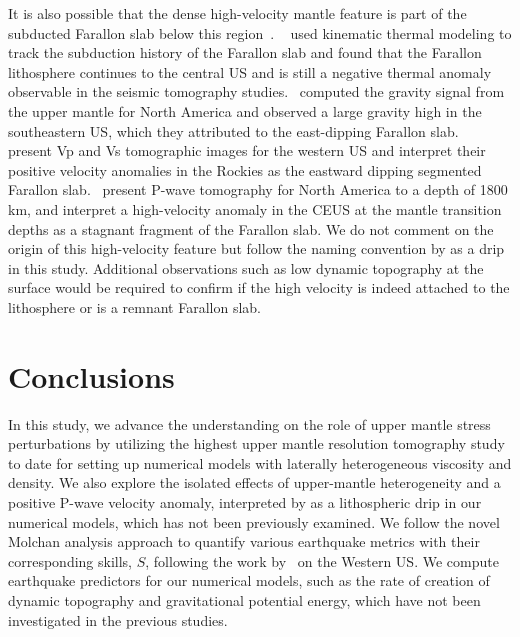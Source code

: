 \documentclass[draft,linenumbers]{agujournal2018}
\begin{document}
 It is also possible that the dense high-velocity mantle feature is part of the subducted Farallon slab below this region~\citep{schmid2002fate, mooney2010north, sigloch2008two, schmandt2010complex, sigloch2011mantle}. ~\citet{schmid2002fate} used kinematic thermal modeling to track the subduction history of the Farallon slab and found that the Farallon lithosphere continues to the central US and is still a negative thermal anomaly observable in the seismic tomography studies.~\citet{mooney2010north} computed the gravity signal from the upper mantle for North America and observed a large gravity high in the southeastern US, which they attributed to the east-dipping Farallon slab.~\citet{schmandt2010complex} present Vp and Vs tomographic images for the western US and interpret their positive velocity anomalies in the Rockies as the eastward dipping segmented Farallon slab.~\citet{sigloch2008two, sigloch2011mantle} present P-wave tomography for North America to a depth of 1800 km, and interpret a high-velocity anomaly in the CEUS at the mantle transition depths as a stagnant fragment of the Farallon slab.  We do not comment on the origin of this high-velocity feature but follow the naming convention by \citet{Biryol_2016} as a drip in this study. Additional observations such as low dynamic topography at the surface would be required to confirm if the high velocity is indeed attached to the lithosphere or is a remnant Farallon slab.
  
\section{Conclusions}

In this study, we advance the understanding on the role of upper mantle  stress perturbations  by utilizing the highest upper mantle resolution tomography study~\citep{Biryol_2016} to date for setting up numerical models with laterally heterogeneous viscosity and density. We also explore the isolated effects of upper-mantle heterogeneity and a positive P-wave velocity anomaly, interpreted by \citet{Biryol_2016} as a lithospheric drip in our numerical models, which has not been previously examined. We follow the novel Molchan analysis approach to quantify various earthquake metrics with their corresponding skills, $S$, following the work by~\citet{becker2015western} on the Western US. We compute earthquake predictors for our numerical models, such as the rate of creation of dynamic topography and gravitational potential energy, which have not been investigated in the previous studies.
\end{document}
